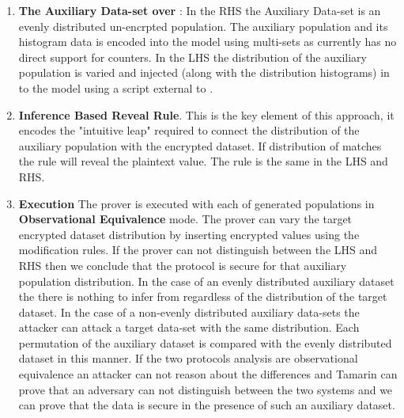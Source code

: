\documentclass[journal]{IEEEtran}
\begin{document}
\begin{enumerate}[label=(\Alph*)]
\item \textbf{The Auxiliary Data-set \aux{} over \auxSpace}:
In the RHS the Auxiliary Data-set \auxsecure{} is an evenly distributed un-encrpted population.  The auxiliary population and its histogram data is encoded into the model using \tamarin{} multi-sets as \tamarin{} currently has no direct support for counters. 
In the LHS the distribution of the auxiliary population is varied and injected (along with the distribution histograms) in to the model using a script external to \tamarin{}.
\item\textbf{ Inference Based Reveal Rule}. This is the key element of this approach, it encodes the "intuitive leap" required to connect the distribution of the auxiliary population with the encrypted dataset.   If  distribution of \aux{} matches \enc{} the rule will reveal the plaintext value. The rule is the same in the LHS and RHS.
\item \textbf{Execution}
The \tamarin{} prover is executed with each of generated \aux{} populations in \textbf{Observational Equivalence} mode. The prover can vary the target encrypted dataset distribution by inserting encrypted values using the modification rules. If the prover can not distinguish between the LHS and RHS then we conclude that the protocol is secure for that auxiliary population distribution.  In the case of an evenly distributed auxiliary dataset the there is nothing to infer from regardless of the distribution of the target dataset. In the case of a non-evenly distributed auxiliary data-sets the attacker can attack a target data-set with the same distribution. Each permutation of the auxiliary dataset is compared with the evenly distributed dataset in this manner. If the two protocols analysis are observational equivalence an attacker can not reason about the differences and Tamarin can prove that an adversary can not distinguish between the two systems and we can prove that the data is secure in the presence of such an auxiliary dataset.

\end{enumerate}
\end{document}
